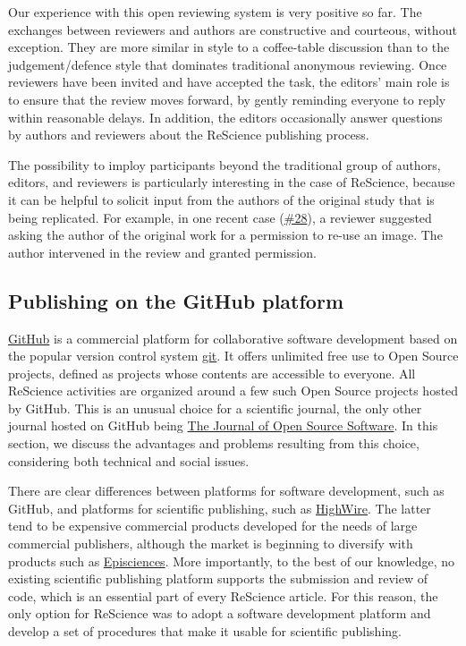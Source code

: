 \documentclass[a4paper,10pt, twocolumn]{article}
\begin{document}
Our experience with this open reviewing system is very positive so
far. The exchanges between reviewers and authors are constructive and
courteous, without exception. They are more similar in style to a
coffee-table discussion than to the judgement/defence style that
dominates traditional anonymous reviewing. Once reviewers have been
invited and have accepted the task, the editors' main role is to
ensure that the review moves forward, by gently reminding everyone to
reply within reasonable delays. In addition, the editors occasionally
answer questions by authors and reviewers about the ReScience
publishing process.

The possibility to imploy participants beyond the traditional group of
authors, editors, and reviewers is particularly interesting in the
case of ReScience, because it can be helpful to solicit input from the
authors of the original study that is being replicated. For example,
in one recent case
(\href{https://github.com/ReScience/ReScience-submission/pull/28}{\#28}),
a reviewer suggested asking the author of the original work for a
permission to re-use an image. The author intervened in the review and
granted permission.

\subsection*{Publishing on the GitHub platform}

\href{http://github.com/}{GitHub} is a commercial platform for
collaborative software development based on the popular version
control system \href{https://git-scm.com/}{git}. It offers unlimited
free use to Open Source projects, defined as projects whose contents
are accessible to everyone. All ReScience activities are organized
around a few such Open Source projects hosted by GitHub. This is an
unusual choice for a scientific journal, the only other journal hosted
on GitHub being \href{http://joss.theoj.org/}{The Journal of Open
Source Software}. In this section, we discuss the advantages and
problems resulting from this choice, considering both technical and
social issues.

There are clear differences between platforms for software
development, such as GitHub, and platforms for scientific publishing,
such as \href{http://home.highwire.org/}{HighWire}. The latter tend to
be expensive commercial products developed for the needs of large
commercial publishers, although the market is beginning to diversify
with products such as
\href{https://www.episciences.org/}{Episciences}.  More importantly,
to the best of our knowledge, no existing scientific publishing
platform supports the submission and review of code, which is an
essential part of every ReScience article. For this reason, the only
option for ReScience was to adopt a software development platform and
develop a set of procedures that make it usable for scientific
publishing.
\end{document}
